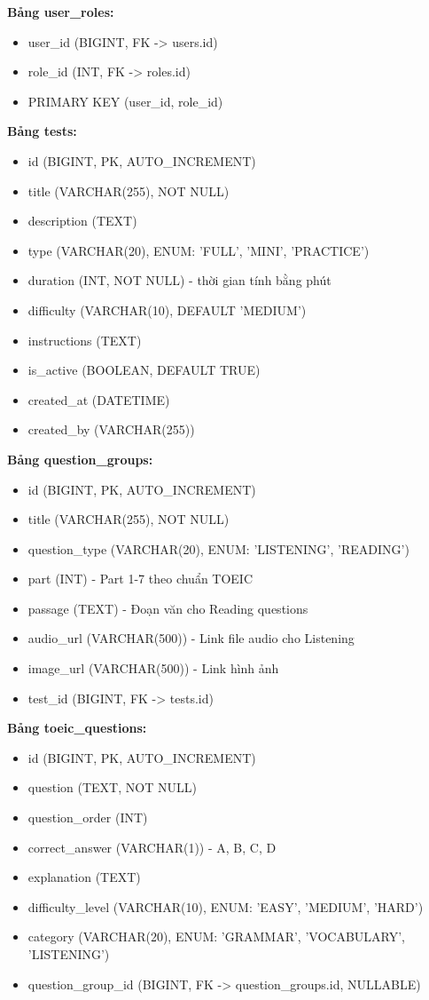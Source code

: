 \documentclass[../DoAn.tex]{subfiles}
\begin{document}
\textbf{Bảng user\_roles:}
\begin{itemize}
    \item user\_id (BIGINT, FK -> users.id)
    \item role\_id (INT, FK -> roles.id)
    \item PRIMARY KEY (user\_id, role\_id)
\end{itemize}

\textbf{Bảng tests:}
\begin{itemize}
    \item id (BIGINT, PK, AUTO\_INCREMENT)
    \item title (VARCHAR(255), NOT NULL)
    \item description (TEXT)
    \item type (VARCHAR(20), ENUM: 'FULL', 'MINI', 'PRACTICE')
    \item duration (INT, NOT NULL) - thời gian tính bằng phút
    \item difficulty (VARCHAR(10), DEFAULT 'MEDIUM')
    \item instructions (TEXT)
    \item is\_active (BOOLEAN, DEFAULT TRUE)
    \item created\_at (DATETIME)
    \item created\_by (VARCHAR(255))
\end{itemize}

\textbf{Bảng question\_groups:}
\begin{itemize}
    \item id (BIGINT, PK, AUTO\_INCREMENT)
    \item title (VARCHAR(255), NOT NULL)
    \item question\_type (VARCHAR(20), ENUM: 'LISTENING', 'READING')
    \item part (INT) - Part 1-7 theo chuẩn TOEIC
    \item passage (TEXT) - Đoạn văn cho Reading questions
    \item audio\_url (VARCHAR(500)) - Link file audio cho Listening
    \item image\_url (VARCHAR(500)) - Link hình ảnh
    \item test\_id (BIGINT, FK -> tests.id)
\end{itemize}

\textbf{Bảng toeic\_questions:}
\begin{itemize}
    \item id (BIGINT, PK, AUTO\_INCREMENT)
    \item question (TEXT, NOT NULL)
    \item question\_order (INT)
    \item correct\_answer (VARCHAR(1)) - A, B, C, D
    \item explanation (TEXT)
    \item difficulty\_level (VARCHAR(10), ENUM: 'EASY', 'MEDIUM', 'HARD')
    \item category (VARCHAR(20), ENUM: 'GRAMMAR', 'VOCABULARY', 'LISTENING')
    \item question\_group\_id (BIGINT, FK -> question\_groups.id, NULLABLE)
\end{itemize}
\end{document}
